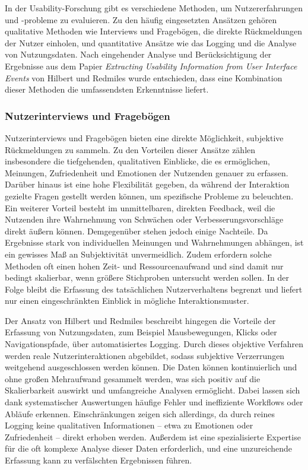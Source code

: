 \documentclass[12pt,oneside]{article}
\begin{document}
In der Usability-Forschung gibt es verschiedene Methoden, um Nutzererfahrungen und -probleme zu evaluieren. Zu den häufig eingesetzten Ansätzen gehören qualitative Methoden wie Interviews und Fragebögen, die direkte Rückmeldungen der Nutzer einholen, und quantitative Ansätze wie das Logging und die Analyse von Nutzungsdaten. Nach eingehender Analyse und Berücksichtigung der Ergebnisse aus dem Papier \textit{Extracting Usability Information from User Interface Events} von Hilbert und Redmiles \cite{Hilbert2000} wurde entschieden, dass eine Kombination dieser Methoden die umfassendsten Erkenntnisse liefert.
\subsubsection{Nutzerinterviews und Fragebögen}
Nutzerinterviews und Fragebögen bieten eine direkte Möglichkeit, subjektive Rückmeldungen zu sammeln. Zu den Vorteilen dieser Ansätze zählen insbesondere die tiefgehenden, qualitativen Einblicke, die es ermöglichen, Meinungen, Zufriedenheit und Emotionen der Nutzenden genauer zu erfassen. Darüber hinaus ist eine hohe Flexibilität gegeben, da während der Interaktion gezielte Fragen gestellt werden können, um spezifische Probleme zu beleuchten. Ein weiterer Vorteil besteht im unmittelbaren, direkten Feedback, weil die Nutzenden ihre Wahrnehmung von Schwächen oder Verbesserungsvorschläge direkt äußern können. Demgegenüber stehen jedoch einige Nachteile. Da Ergebnisse stark von individuellen Meinungen und Wahrnehmungen abhängen, ist ein gewisses Maß an Subjektivität unvermeidlich. Zudem erfordern solche Methoden oft einen hohen Zeit- und Ressourcenaufwand und sind damit nur bedingt skalierbar, wenn größere Stichproben untersucht werden sollen. In der Folge bleibt die Erfassung des tatsächlichen Nutzerverhaltens begrenzt und liefert nur einen eingeschränkten Einblick in mögliche Interaktionsmuster.

Der Ansatz von Hilbert und Redmiles \cite{Hilbert2000} beschreibt hingegen die Vorteile der Erfassung von Nutzungsdaten, zum Beispiel Mausbewegungen, Klicks oder Navigationspfade, über automatisiertes Logging. Durch dieses objektive Verfahren werden reale Nutzerinteraktionen abgebildet, sodass subjektive Verzerrungen weitgehend ausgeschlossen werden können. Die Daten können kontinuierlich und ohne großen Mehraufwand gesammelt werden, was sich positiv auf die Skalierbarkeit auswirkt und umfangreiche Analysen ermöglicht. Dabei lassen sich dank systematischer Auswertungen häufige Fehler und ineffiziente Workflows oder Abläufe erkennen. Einschränkungen zeigen sich allerdings, da durch reines Logging keine qualitativen Informationen – etwa zu Emotionen oder Zufriedenheit – direkt erhoben werden. Außerdem ist eine spezialisierte Expertise für die oft komplexe Analyse dieser Daten erforderlich, und eine unzureichende Erfassung kann zu verfälschten Ergebnissen führen.
\end{document}
